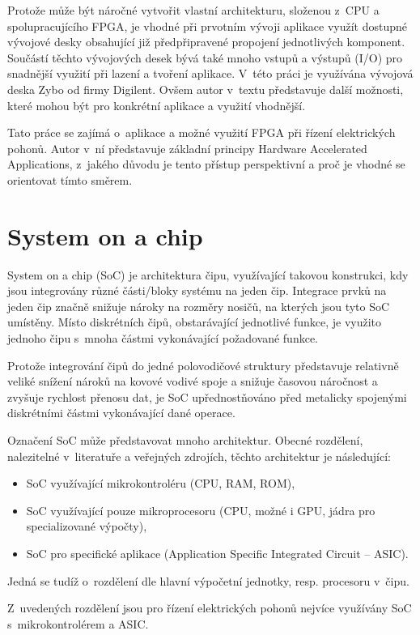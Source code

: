 \documentclass[a4paper, twoside, 11pt]{article}
\begin{document}
Protože může být náročné vytvořit vlastní architekturu, složenou z~CPU a spolupracujícího FPGA, je vhodné při prvotním vývoji aplikace využít dostupné vývojové desky obsahující již předpřipravené propojení jednotlivých komponent. Součástí těchto vývojových desek bývá také mnoho vstupů a výstupů (I/O) pro snadnější využití při lazení a tvoření aplikace. V~této práci je využívána vývojová deska Zybo od firmy Digilent. Ovšem autor v~textu představuje další možnosti, které mohou být pro konkrétní aplikace a využití vhodnější.\par
Tato práce se zajímá o~aplikace a možné využití FPGA při řízení elektrických pohonů. Autor v~ní představuje základní principy Hardware Accelerated Applications, z~jakého důvodu je tento přístup perspektivní a proč je vhodné se orientovat tímto směrem.\par
\flushbottom %
\newpage

\section{System on a chip}\label{sec:system-on-a-chip}
	System on a chip (SoC) je architektura čipu, využívající takovou konstrukci, kdy jsou integrovány různé části/bloky systému na jeden čip. Integrace prvků na jeden čip značně snižuje nároky na rozměry nosičů, na kterých jsou tyto SoC umístěny. Místo diskrétních čipů, obstarávající jednotlivé funkce, je využito jednoho čipu s~mnoha částmi vykonávající požadované funkce.\par
	Protože integrování čipů do jedné polovodičové struktury představuje relativně veliké snížení nároků na kovové vodivé spoje a snižuje časovou náročnost a zvyšuje rychlost přenosu dat, je SoC upřednostňováno před metalicky spojenými diskrétními částmi vykonávající dané operace.\par
	Označení SoC může představovat mnoho architektur. Obecné rozdělení, nalezitelné v~literatuře a veřejných zdrojích, těchto architektur je následující:
	\begin{itemize}
		\item SoC využívající mikrokontroléru (CPU, RAM, ROM),
		\item SoC využívající pouze mikroprocesoru (CPU, možné i GPU, jádra pro specializované výpočty),
		\item SoC pro specifické aplikace (Application Specific Integrated Circuit – ASIC).
	\end{itemize}
	Jedná se tudíž o~rozdělení dle hlavní výpočetní jednotky, resp. procesoru v~čipu. \cite{tomshardware-system-on-chip}\par
	Z~uvedených rozdělení jsou pro řízení elektrických pohonů nejvíce využívány SoC s~mikrokontrolérem a ASIC.
\end{document}
